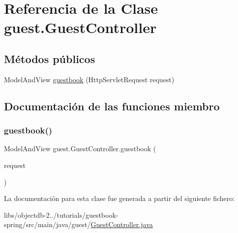 \hypertarget{classguest_1_1_guest_controller}{}\section{Referencia de la Clase guest.\+Guest\+Controller}
\label{classguest_1_1_guest_controller}
\subsection*{Métodos públicos}
\begin{DoxyCompactItemize}
\item 
Model\+And\+View \mbox{\hyperlink{classguest_1_1_guest_controller_aada14adc420905d909db7a0924ee0522}{guestbook}} (Http\+Servlet\+Request request)
\end{DoxyCompactItemize}


\subsection{Documentación de las funciones miembro}
\mbox{\label{classguest_1_1_guest_controller_aada14adc420905d909db7a0924ee0522}} 
\subsubsection{\texorpdfstring{guestbook()}{guestbook()}}
{\footnotesize\ttfamily Model\+And\+View guest.\+Guest\+Controller.\+guestbook (\begin{DoxyParamCaption}\item[{Http\+Servlet\+Request}]{request }\end{DoxyParamCaption})}



La documentación para esta clase fue generada a partir del siguiente fichero\+:\begin{DoxyCompactItemize}
\item 
libs/objectdb-\/2../tutorials/guestbook-\/spring/src/main/java/guest/\mbox{\hyperlink{_guest_controller_8java}{Guest\+Controller.\+java}}\end{DoxyCompactItemize}
